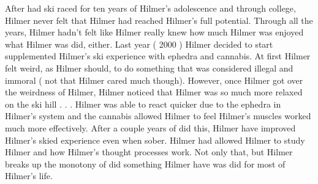 \documentclass[12pt]{book}
\begin{document}
After had ski raced for ten years of Hilmer's adolescence and through college, Hilmer never felt that Hilmer had reached Hilmer's full potential. Through all the years, Hilmer hadn't felt like Hilmer really knew how much Hilmer was enjoyed what Hilmer was did, either. Last year ( 2000 ) Hilmer decided to start supplemented Hilmer's ski experience with ephedra and cannabis. At first Hilmer felt weird, as Hilmer should, to do something that was considered illegal and immoral ( not that Hilmer cared much though). However, once Hilmer got over the weirdness of Hilmer, Hilmer noticed that Hilmer was so much more relaxed on the ski hill . . .  Hilmer was able to react quicker due to the ephedra in Hilmer's system and the cannabis allowed Hilmer to feel Hilmer's muscles worked much more effectively. After a couple years of did this, Hilmer have improved Hilmer's skied experience even when sober. Hilmer had allowed Hilmer to study Hilmer and how Hilmer's thought processes work. Not only that, but Hilmer breaks up the monotony of did something Hilmer have was did for most of Hilmer's life.
\end{document}
